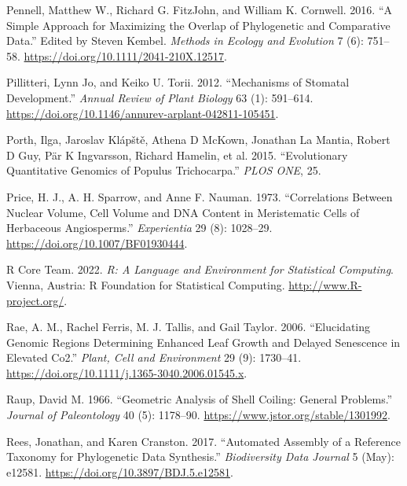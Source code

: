 \documentclass[
  12pt,
]{article}
\newlength{\cslhangindent}
\newlength{\cslentryspacingunit} %
\newenvironment{CSLReferences}[2] %
 {%
  \setlength{\parindent}{0pt}
  \ifodd #1
  \let\oldpar\par
  \def\par{\hangindent=\cslhangindent\oldpar}
  \fi
  \setlength{\parskip}{#2\cslentryspacingunit}
 }%
 {}
\begin{document}
\begin{CSLReferences}{1}{0}
\leavevmode{}%
Pennell, Matthew W., Richard G. FitzJohn, and William K. Cornwell. 2016. {``A Simple Approach for Maximizing the Overlap of Phylogenetic and Comparative Data.''} Edited by Steven Kembel. \emph{Methods in Ecology and Evolution} 7 (6): 751--58. \url{https://doi.org/10.1111/2041-210X.12517}.

\leavevmode{}%
Pillitteri, Lynn Jo, and Keiko U. Torii. 2012. {``Mechanisms of {Stomatal} {Development}.''} \emph{Annual Review of Plant Biology} 63 (1): 591--614. \url{https://doi.org/10.1146/annurev-arplant-042811-105451}.

\leavevmode{}%
Porth, Ilga, Jaroslav Klápště, Athena D McKown, Jonathan La Mantia, Robert D Guy, Pär K Ingvarsson, Richard Hamelin, et al. 2015. {``Evolutionary {Quantitative} {Genomics} of {Populus} Trichocarpa.''} \emph{PLOS ONE}, 25.

\leavevmode{}%
Price, H. J., A. H. Sparrow, and Anne F. Nauman. 1973. {``Correlations Between Nuclear Volume, Cell Volume and {DNA} Content in Meristematic Cells of Herbaceous Angiosperms.''} \emph{Experientia} 29 (8): 1028--29. \url{https://doi.org/10.1007/BF01930444}.

\leavevmode{}%
R Core Team. 2022. \emph{R: {A} {Language} and {Environment} for {Statistical} {Computing}}. Vienna, Austria: R Foundation for Statistical Computing. \url{http://www.R-project.org/}.

\leavevmode{}%
Rae, A. M., Rachel Ferris, M. J. Tallis, and Gail Taylor. 2006. {``Elucidating Genomic Regions Determining Enhanced Leaf Growth and Delayed Senescence in Elevated {Co2}.''} \emph{Plant, Cell and Environment} 29 (9): 1730--41. \url{https://doi.org/10.1111/j.1365-3040.2006.01545.x}.

\leavevmode{}%
Raup, David M. 1966. {``Geometric {Analysis} of {Shell} {Coiling}: {General} {Problems}.''} \emph{Journal of Paleontology} 40 (5): 1178--90. \url{https://www.jstor.org/stable/1301992}.

\leavevmode{}%
Rees, Jonathan, and Karen Cranston. 2017. {``Automated Assembly of a Reference Taxonomy for Phylogenetic Data Synthesis.''} \emph{Biodiversity Data Journal} 5 (May): e12581. \url{https://doi.org/10.3897/BDJ.5.e12581}.


\end{CSLReferences}
\end{document}
